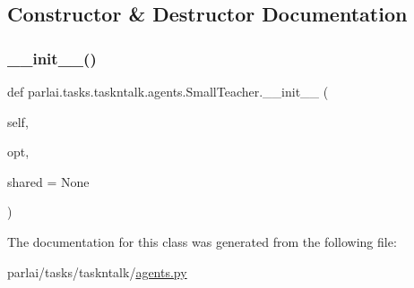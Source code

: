 \subsection{Constructor \& Destructor Documentation}
\mbox{\label{classparlai_1_1tasks_1_1taskntalk_1_1agents_1_1SmallTeacher_a840dfb1bc33447c389006c6b846babe0}} 
\subsubsection{\texorpdfstring{\+\_\+\+\_\+init\+\_\+\+\_\+()}{\_\_init\_\_()}}
{\footnotesize\ttfamily def parlai.\+tasks.\+taskntalk.\+agents.\+Small\+Teacher.\+\_\+\+\_\+init\+\_\+\+\_\+ (\begin{DoxyParamCaption}\item[{}]{self,  }\item[{}]{opt,  }\item[{}]{shared = {\ttfamily None} }\end{DoxyParamCaption})}



The documentation for this class was generated from the following file\+:\begin{DoxyCompactItemize}
\item 
parlai/tasks/taskntalk/\hyperlink{parlai_2tasks_2taskntalk_2agents_8py}{agents.\+py}\end{DoxyCompactItemize}
